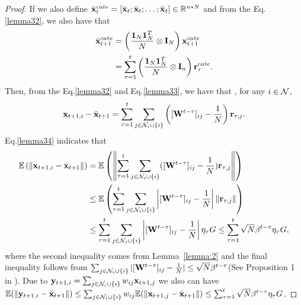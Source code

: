 \begin{proof}
		If we also define $\bar{\mathbf{x}}_{t}^{cate}=[\bar{\mathbf{x}}_{t};\bar{\mathbf{x}}_{t};\dots;\bar{\mathbf{x}}_{t}]\in\mathbb{R}^{n*N}$ and from the Eq.\eqref{lemma32}, we also have that
		\begin{equation}\label{lemma33}
			\begin{aligned}				\bar{\mathbf{x}}_{t+1}^{cate}&=\left(\frac{\mathbf{1}_{N}\mathbf{1}_{N}^{T}}{N}\otimes\mathbf{I}_{N}\right)\mathbf{x}_{t+1}^{cate}\\
				&=\sum_{\tau=1}^{t}\left(\frac{\mathbf{1}_{N}\mathbf{1}_{N}^{T}}{N}\otimes\mathbf{I}_{n}\right)\mathbf{r}_{\tau}^{cate}.
			\end{aligned}
		\end{equation}
		Then, from the Eq.\eqref{lemma32} and Eq.\eqref{lemma33}, we have that , for any $i\in\mathcal{N}$,
		\begin{equation}\label{lemma34}
			\mathbf{x}_{t+1,i}-\bar{\mathbf{x}}_{t+1}=\sum_{\tau=1}^{t}\sum_{j\in\mathcal{N}_{i}\cup\{i\}}\left([\mathbf{W}^{t-\tau}]_{ij}-\frac{1}{N}\right)\mathbf{r}_{\tau,j}.
		\end{equation}
		Eq.\eqref{lemma34} indicates that
		\begin{equation*}
			\begin{aligned}
				\mathbb{E}\left(\left\|\mathbf{x}_{t+1,i}-\bar{\mathbf{x}}_{t+1}\right\|\right)&=\mathbb{E}\left(\left\|\sum_{\tau=1}^{t}\sum_{j\in\mathcal{N}_{i}\cup\{i\}}([\mathbf{W}^{t-\tau}]_{ij}-\frac{1}{N})\mathbf{r}_{\tau,j}\right\|\right)
                \\&\le\mathbb{E}\left(\sum_{\tau=1}^{t}\sum_{j\in\mathcal{N}_{i}\cup\{i\}}\left|[\mathbf{W}^{t-\tau}]_{ij}-\frac{1}{N}\right |\left\|	\mathbf{r}_{\tau,j}\right\|\right)\\&\le\sum_{\tau=1}^{t}\sum_{j\in\mathcal{N}_{i}\cup\{i\}}\left|[\mathbf{W}^{t-\tau}]_{ij}-\frac{1}{N}\right|\eta_{\tau}G\le\sum_{\tau=1}^{t}\sqrt{N}\beta^{t-\tau}\eta_{\tau}G,
			\end{aligned}
		\end{equation*} where the second inequality comes from Lemma~\ref{lemma:2} and the final inequality follows from $\sum_{j\in\mathcal{N}_{i}\cup\{i\}}|[\mathbf{W}^{t-\tau}]_{ij}-\frac{1}{N}|\le\sqrt{N}\beta^{t-\tau}$(See Proposition 1  in \citep{nedic2009distributed}).
		Due to $\mathbf{y}_{t+1,i}=\sum_{j\in\mathcal{N}_{i}\cup\{i\}}w_{ij}\mathbf{x}_{t+1,j}$ we also can have $\mathbb{E}(\|\mathbf{y}_{t+1,i}-\bar{\mathbf{x}}_{t+1}\|)\le\sum_{j\in\mathcal{N}_{i}\cup\{i\}}w_{ij}\mathbb{E}(\|\mathbf{x}_{t+1,j}-\bar{\mathbf{x}}_{t+1}\|)\le \sum_{\tau=1}^{t}\sqrt{N}\beta^{t-\tau}\eta_{\tau}G$.

	\end{proof}
